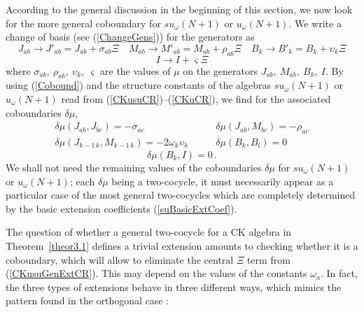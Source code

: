 \documentclass[12pt]{article}
\begin{document}
According to the general discussion in the beginning of this section,
we now look for the more general coboundary for ${su}_{\omega}(N+1)$ or
${u}_{\omega}(N+1)$. We write a change of basis (see (\ref{ChangeGens}))
for the generators as
\begin{equation}
{J}_{ab}\to {J}'_{ab}={J}_{ab}+{\sigma}_{ab}\Xi  \quad
{M}_{ab}\to {M}'_{ab}={M}_{ab}+{\rho}_{ab}\Xi  \quad
{B}_{k}\to {B}'_{k}={B}_{k}+{\upsilon}_{k}\Xi
\label{ddequiv}
\end{equation}
\begin{equation}
{I} \to {I} + {\varsigma} \Xi
\end{equation}
where ${\sigma}_{ab},\ {\rho}_{ab},\ {\upsilon}_{k},\ {\varsigma}$ are the values
of $\mu$ on the generators ${J}_{ab},\ {M}_{ab},\ {B}_{k},\ {I}$.
By using (\ref{Cobound}) and the structure constants of the algebras
${su}_{\omega}(N+1)$ or ${u}_{\omega}(N+1)$
read from (\ref{CKusuCR})--(\ref{CKuCR}),
we find for the associated coboundaries $\delta\mu$,
\begin{equation}
\begin{array}{ll}
\delta\mu({J}_{ab}, {J}_{bc}) = - {\sigma}_{ac} & \qquad
\delta\mu({J}_{ab}, {M}_{bc}) = - {\rho}_{ac} \\
\delta\mu({J}_{k-1\, k}, {M}_{k-1\, k}) = -2 {\omega}_k {\upsilon}_{k} & \qquad
\delta\mu({B}_{k}, {B}_{l}) = 0
\end{array}
\label{CKusuCobound}
\end{equation}
\begin{equation}
\delta\mu({B}_k, {I})=0\,.
\label{CKuCobound}
\end{equation}
We shall not need the remaining values of the coboundaries $\delta\mu$ for
${su}_{\omega}(N+1)$ or ${u}_{\omega}(N+1)$;  each
$\delta\mu$ being a two-cocycle, it must necessarily appear as a
particular case of the most general two-cocycles which are completely
determined by the basic extension coefficients (\ref{suBasicExtCoef}).

The question of whether a general two-cocycle for a CK
algebra in Theorem~\ref{theor3.1} defines a trivial extension
amounts to checking whether it is a coboundary, which will allow to
eliminate the central $\Xi$ term from (\ref{CKusuGenExtCR}). This
may depend on the values of the constants ${\omega}_a$. In fact, the
three types of extensions  behave in three different ways, which
mimics the pattern found in the orthogonal case \cite{Azc.Her.Bue.San:96}:
\end{document}
